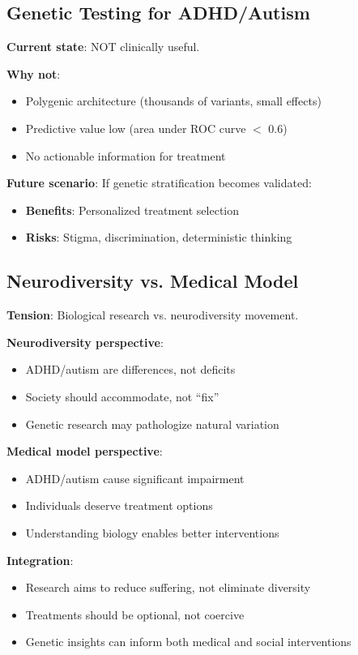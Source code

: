 \documentclass[12pt,letterpaper]{article}
\begin{document}
\subsection{Genetic Testing for ADHD/Autism}

\textbf{Current state}: NOT clinically useful.

\textbf{Why not}:
\begin{itemize}
    \item Polygenic architecture (thousands of variants, small effects)
    \item Predictive value low (area under ROC curve $<$ 0.6)
    \item No actionable information for treatment
\end{itemize}

\textbf{Future scenario}: If genetic stratification becomes validated:
\begin{itemize}
    \item \textbf{Benefits}: Personalized treatment selection
    \item \textbf{Risks}: Stigma, discrimination, deterministic thinking
\end{itemize}

\subsection{Neurodiversity vs. Medical Model}

\textbf{Tension}: Biological research vs. neurodiversity movement.

\textbf{Neurodiversity perspective}:
\begin{itemize}
    \item ADHD/autism are differences, not deficits
    \item Society should accommodate, not ``fix''
    \item Genetic research may pathologize natural variation
\end{itemize}

\textbf{Medical model perspective}:
\begin{itemize}
    \item ADHD/autism cause significant impairment
    \item Individuals deserve treatment options
    \item Understanding biology enables better interventions
\end{itemize}

\textbf{Integration}:
\begin{itemize}
    \item Research aims to reduce suffering, not eliminate diversity
    \item Treatments should be optional, not coercive
    \item Genetic insights can inform both medical and social interventions
\end{itemize}
\end{document}
